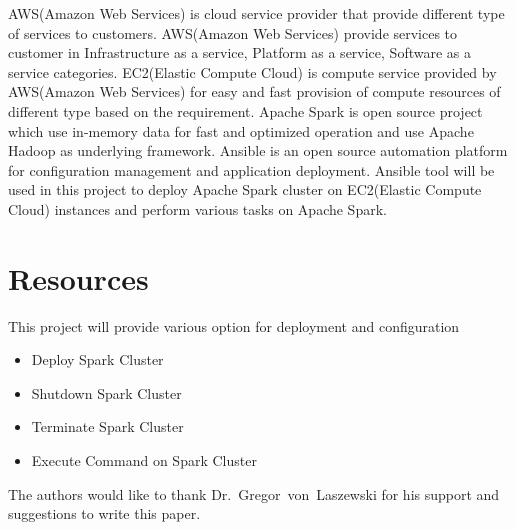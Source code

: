 AWS(Amazon Web Services)\cite{hid-sp18-511-www-aws} is cloud service
provider that provide different type of services to
customers. AWS(Amazon Web Services)\cite{hid-sp18-511-www-aws} provide
services to customer in Infrastructure as a service, Platform as a
service, Software as a service categories. EC2(Elastic Compute
Cloud)\cite{hid-sp18-511-www-ec2} is compute service provided by
AWS(Amazon Web Services)\cite{hid-sp18-511-www-aws} for easy and fast
provision of compute resources of different type based on the
requirement. Apache Spark\cite{hid-sp18-511-www-spark} is open source
project which use in-memory data for fast and optimized operation and
use Apache Hadoop\cite{hid-sp18-511-www-hadoop} as underlying
framework. Ansible\cite{bibid} is an open source automation platform
for configuration management and application
deployment. Ansible\cite{hid-sp18-511-www-ansible} tool will be used
in this project to deploy Apache Spark\cite{hid-sp18-511-www-spark}
cluster on EC2(Elastic Compute Cloud)\cite{hid-sp18-511-www-ec2}
instances and perform various tasks on Apache
Spark\cite{hid-sp18-511-www-spark}.

\section{Resources}
This project will provide various option for deployment and
configuration

\begin{itemize}
	\item Deploy Spark Cluster
        \item Shutdown Spark Cluster
        \item Terminate Spark Cluster
        \item Execute Command on Spark Cluster
\end{itemize}

\begin{acks}

  The authors would like to thank Dr.~Gregor~von~Laszewski for his
  support and suggestions to write this paper.

\end{acks}


 

